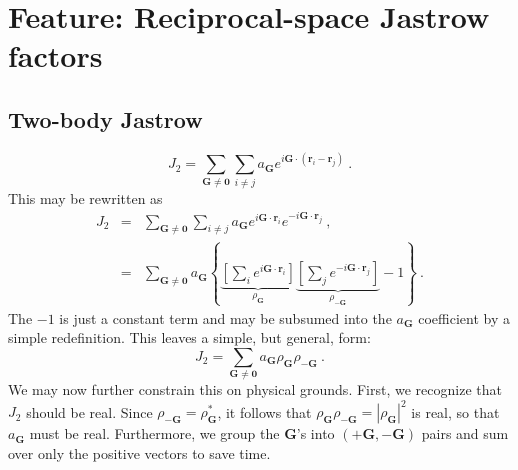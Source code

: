 \section{Feature: Reciprocal-space Jastrow factors}
\label{sec:feature_kspace_jastrow}


\renewcommand{\vG}{\mathbf{G}}
\renewcommand{\vr}{\mathbf{r}}
\renewcommand{\vI}{\mathbf{I}}

\subsection{Two-body Jastrow}
\begin{equation}
J_2 = \sum_{\vG\neq \mathbf{0}}\sum_{i\neq j} a_\vG e^{i\vG\cdot(\vr_i-\vr_j)}\:.
\end{equation}
This may be rewritten as
\begin{eqnarray}
J_2 & = & \sum_{\vG\neq \mathbf{0}}\sum_{i\neq j} a_\vG e^{i\vG\cdot\vr_i}e^{-i\vG\cdot\vr_j}\:, \\
& = & \sum_{\vG\neq \mathbf{0}} a_\vG \left\{
\underbrace{\left[\sum_i e^{i\vG\cdot\vr_i} \right]}_{\rho_\vG}
\underbrace{\left[\sum_j e^{-i\vG\cdot\vr_j} \right]}_{\rho_{-\vG}}  -1 \right\}\:.
\end{eqnarray}
The $-1$ is just a constant term and may be subsumed into the $a_\vG$
coefficient by a simple redefinition.  This leaves a simple, but
general, form:
\begin{equation}
J_2 = \sum_{\vG\neq\mathbf{0}} a_\vG \rho_\vG \rho_{-\vG}\:.
\end{equation}
We may now further constrain this on physical grounds.  First, we
recognize that $J_2$ should be real.  Since $\rho_{-\vG} =
\rho_\vG^*$, it follows that $\rho_{\vG}\rho_{-\vG} = |\rho_\vG|^2$ is
real, so that $a_\vG$ must be real.  Furthermore, we group the $\vG$'s
into $(+\vG, -\vG)$ pairs and sum over only the positive vectors to
save time.

